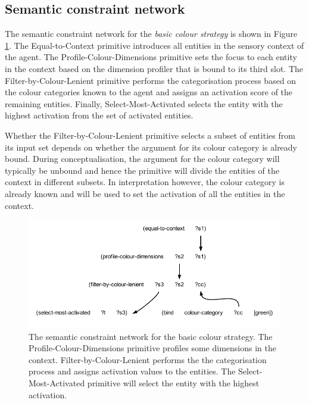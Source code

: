 \subsection{Semantic constraint network}

The semantic constraint network for the \emph{basic colour strategy} is shown
in Figure \ref{f:bcs-semantic-structure}. The {\sc
  Equal-to-Context} primitive introduces all entities in the sensory
context of the agent. The {\sc Profile-Colour-Dimensions} primitive
sets the focus to each entity in the context based on the dimension
profiler that is bound to its third slot. The {\sc
  Filter-by-Colour-Lenient} primitive performs the categorisation
process based on the colour categories known to the agent and assigns
an activation score of the remaining entities. Finally, {\sc
  Select-Most-Activated} selects the entity with the highest
activation from the set of activated entities.

Whether the {\sc Filter-by-Colour-Lenient} primitive selects a subset
of entities from its input set depends on whether the argument for its
colour category is already bound. During conceptualisation, the
argument for the colour category will typically be unbound and hence
the primitive will divide the entities of the context in different
subsets. In interpretation however, the colour category is already
known and will be used to set the activation of all the entities in
the context.

\begin{figure}[htbp]
  \begin{center}
    \includegraphics[width=\textwidth]{./basic-strategy/figures/semantics-interpretation.pdf}
    \caption[The semantic constraint network for the basic colour
    strategy]{The semantic constraint network for the basic colour
      strategy. The {\sc Profile-Colour-Dimensions} primitive profiles
      some dimensions in the context. {\sc Filter-by-Colour-Lenient}
      performs the the categorisation process and assigns activation
      values to the entities. The {\sc Select-Most-Activated}
      primitive will select the entity with the highest activation.}
    \label{f:bcs-semantic-structure}
  \end{center}
\end{figure}

